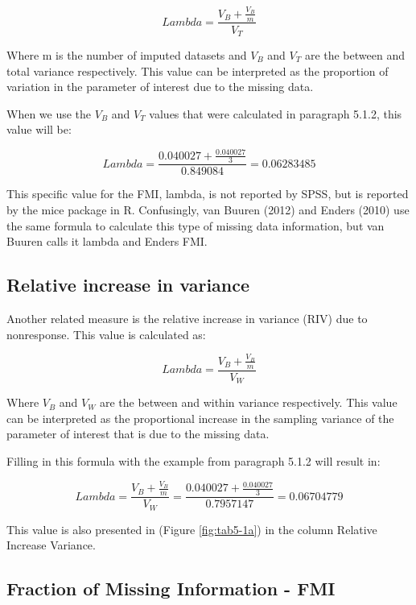 \documentclass[]{book}
\theoremstyle{definition}
\theoremstyle{definition}
\theoremstyle{definition}
\theoremstyle{remark}
\begin{document}
\begin{equation}
Lambda = \frac{V_B + \frac{V_B}{m}}{V_T}
  \label{eq:lambda}
\end{equation}

Where m is the number of imputed datasets and \({V_B}\) and \({V_T}\)
are the between and total variance respectively. This value can be
interpreted as the proportion of variation in the parameter of interest
due to the missing data.

When we use the \({V_B}\) and \({V_T}\) values that were calculated in
paragraph 5.1.2, this value will be:

\[Lambda = \frac{0.040027 + \frac{0.040027}{3}}{0.849084}=0.06283485\]

This specific value for the FMI, lambda, is not reported by SPSS, but is
reported by the mice package in R. Confusingly, van Buuren (2012) and
Enders (2010) use the same formula to calculate this type of missing
data information, but van Buuren calls it lambda and Enders FMI.

\subsection{Relative increase in
variance}\label{relative-increase-in-variance}

Another related measure is the relative increase in variance (RIV) due
to nonresponse. This value is calculated as:

\begin{equation}
Lambda = \frac{V_B + \frac{V_B}{m}}{V_W}
  \label{eq:riv}
\end{equation}

Where \({V_B}\) and \({V_W}\) are the between and within variance
respectively. This value can be interpreted as the proportional increase
in the sampling variance of the parameter of interest that is due to the
missing data.

Filling in this formula with the example from paragraph 5.1.2 will
result in:

\[Lambda = \frac{V_B + \frac{V_B}{m}}{V_W}=\frac{0.040027 + \frac{0.040027}{3}}{0.7957147}=0.06704779\]

This value is also presented in (Figure \ref{fig:tab5-1a}) in the column
Relative Increase Variance.

\subsection{Fraction of Missing Information -
FMI}\label{fraction-of-missing-information---fmi}
\end{document}
